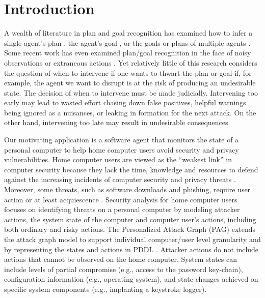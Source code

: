 \section{Introduction}
A wealth of literature in plan and goal recognition has examined how to infer a single agent's plan \cite{GeibGoldman09, ramirez2009plan}, the agent's goal \cite{ramirez2011goalrecog, yin2004high}, or the goals or plans of multiple agents \cite{banerjee2010mpr, kaminka2002monitoring}. Some recent work has even examined plan/goal recognition in the face of noisy observations \cite{geib2005partial, vattam2015case} or extraneous actions \cite{gal2012plan, sohrabi2016finding}. Yet relatively little of this research considers the question of when to intervene if one wants to thwart the plan or goal if, for example, the agent we want to disrupt is at the risk of producing an undesirable state. The decision of when to intervene must be made judicially. Intervening too early may lead to wasted effort chasing down false positives, helpful warnings being ignored as a nuisances, or leaking in formation for the next attack. On the other hand, intervening too late may result in undesirable consequences.

Our motivating application is a software agent that monitors the state of a personal computer to help home computer users avoid security and privacy vulnerabilities. Home computer users are viewed as the ``weakest link'' in computer security because they lack the time, knowledge and resources to defend against the increasing incidents of computer security and privacy threats \cite{sasse2001transforming}. Moreover, some threats, such as software downloads and phishing, require user action or at least acquiescence \cite{howe2012psychology}. Security analysis for home computer users focuses on identifying threats on a personal computer by modeling attacker actions, the system state of the computer and computer user's actions, including both ordinary and risky actions. The Personalized Attack Graph (PAG) extends the attack graph model \cite{Sheyner2002} to support individual computer/user level granularity and by representing the states and actions in PDDL \cite{urbanska2013}. Attacker actions do not include actions that cannot be observed on the home computer. System states can include levels of partial compromise (e.g., access to the password key-chain), configuration information (e.g., operating system), and state changes achieved on specific system components (e.g., implanting a keystroke logger).

